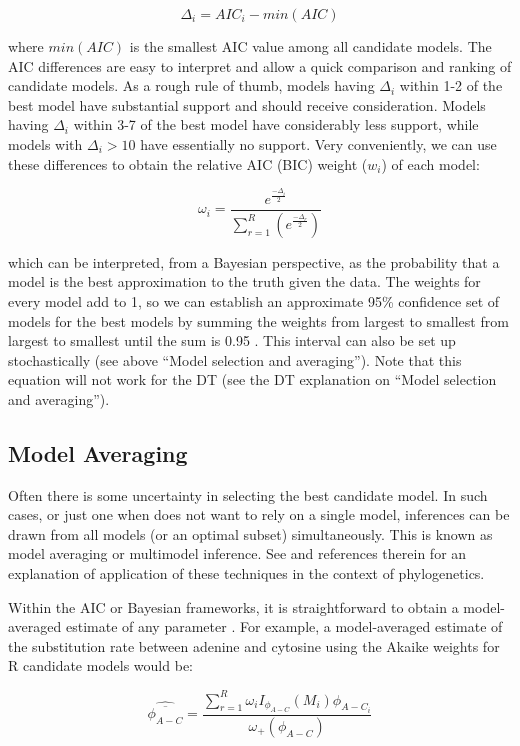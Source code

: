 \[
\Delta_i = AIC_i - min(AIC)
\]

where $min(AIC)$ is the smallest AIC value among all candidate models. The AIC differences are easy to interpret and allow a quick comparison and ranking of candidate models. As a rough rule of thumb, models having $\Delta_i$ within 1-2 of the best model have substantial support and should receive consideration. Models having $\Delta_i$ within 3-7 of the best model have considerably less support, while models with $\Delta_i > 10$ have essentially no support. Very conveniently, we can use these differences to obtain the relative AIC (BIC) weight ($w_i$) of each model:

\[
\omega_i = \frac{e^{\frac{-\Delta_i}{2}}}{\sum_{r=1}^R(e^\frac{-\Delta_r}{2})}
\]

which can be interpreted, from a Bayesian perspective, as the probability that a model is the best approximation to the truth given the data. The weights for every model add to 1, so we can establish an approximate 95\% confidence set of models for the best models by summing the weights from largest to smallest from largest to smallest until the sum is 0.95 \citep{Burnham-1998, Burnham-2003}. This interval can also be set up stochastically (see above ``Model selection and averaging''). Note that this equation will not work for the DT (see the DT explanation on ``Model selection and averaging'').

\subsection{Model Averaging}
\label{sec:model-averaging}

Often there is some uncertainty in selecting the best candidate model. In such cases, or just one when does not want to rely on a single model, inferences can be drawn from all models (or an optimal subset) simultaneously. This is known as model averaging or multimodel inference. See \citet{Posada-2004} and references therein for an explanation of application of these techniques in the context of phylogenetics.

Within the AIC or Bayesian frameworks, it is straightforward to obtain a model-averaged estimate of any parameter \citep{Madigan-1994, Raftery-1996, Hoeting-1999, Wasserman-2000, Burnham-2003, Posada-2003}. For example, a model-averaged estimate of the substitution rate between adenine and cytosine using the Akaike weights for R candidate models would be:

\[
\widehat{\overline{\phi_{A-C}}} = \frac{\sum_{r=1}^R \omega_i I_{\phi_{A-C}}(M_i) \phi_{A-C_i}}{\omega_+(\phi_{A-C})}
\]

